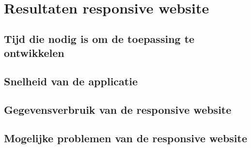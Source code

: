 \chapter{Resultaten responsive website}
\label{ch:resultatenresponsivewebsite}
\section{Tijd die nodig is om de toepassing te ontwikkelen}

\section{Snelheid van de applicatie}

\section{Gegevensverbruik van de responsive website}

\section{Mogelijke problemen van de responsive website}
